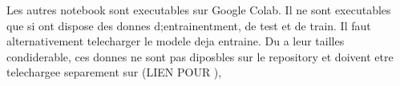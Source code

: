 Les autres notebook sont executables sur Google Colab. Il ne sont executables que si ont dispose des donnes d;entrainentment, de test et de train. Il faut alternativement telecharger le modele deja entraine. Du a leur tailles condiderable, ces donnes ne sont pas diposbles sur le repository et doivent etre telechargee separement sur (LIEN POUR ), 
